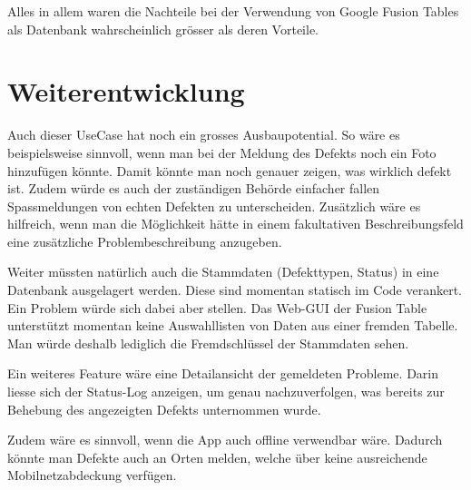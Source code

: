 Alles in allem waren die Nachteile bei der Verwendung von Google Fusion Tables als Datenbank wahrscheinlich grösser als deren Vorteile.

\section{Weiterentwicklung}
Auch dieser UseCase hat noch ein grosses Ausbaupotential. So wäre es beispielsweise sinnvoll, wenn man bei der Meldung des Defekts noch ein Foto hinzufügen könnte. Damit könnte man noch genauer zeigen, was wirklich defekt ist. Zudem würde es auch der zuständigen Behörde einfacher fallen Spassmeldungen von echten Defekten zu unterscheiden. Zusätzlich wäre es hilfreich, wenn man die Möglichkeit hätte in einem fakultativen Beschreibungsfeld eine zusätzliche Problembeschreibung anzugeben.

Weiter müssten natürlich auch die Stammdaten (Defekttypen, Status) in eine Datenbank ausgelagert werden. Diese sind momentan statisch im Code verankert. Ein Problem würde sich dabei aber stellen. Das Web-GUI der Fusion Table unterstützt momentan keine Auswahllisten von Daten aus einer fremden Tabelle. Man würde deshalb lediglich die Fremdschlüssel der Stammdaten sehen.

Ein weiteres Feature wäre eine Detailansicht der gemeldeten Probleme. Darin liesse sich der Status-Log anzeigen, um genau nachzuverfolgen, was bereits zur Behebung des angezeigten Defekts unternommen wurde. 

Zudem wäre es sinnvoll, wenn die App auch offline verwendbar wäre. Dadurch könnte man Defekte auch an Orten melden, welche über keine ausreichende Mobilnetzabdeckung verfügen.